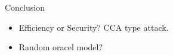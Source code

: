 % 
%  
%  

\begin{frame}{Conclusion}

  \begin{itemize}
  \item Efficiency or Security? CCA type attack.
  \item Random oracel model?
  \end{itemize}
  
\end{frame}
